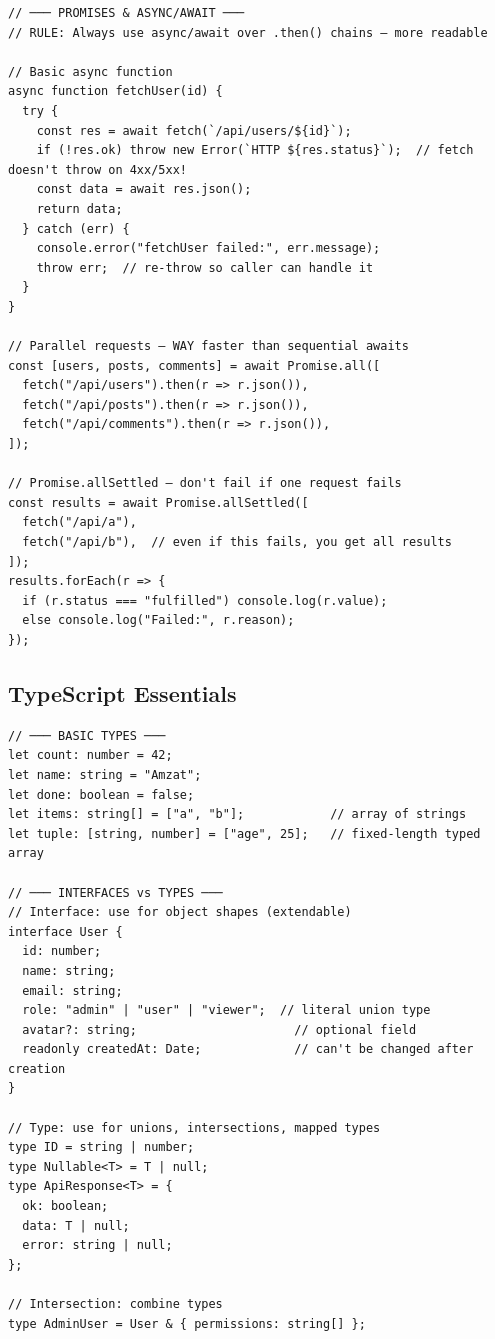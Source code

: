 \documentclass[10pt, a4paper]{article}
\begin{document}
\begin{lstlisting}[language=myjs]
// ─── PROMISES & ASYNC/AWAIT ───
// RULE: Always use async/await over .then() chains — more readable

// Basic async function
async function fetchUser(id) {
  try {
    const res = await fetch(`/api/users/${id}`);
    if (!res.ok) throw new Error(`HTTP ${res.status}`);  // fetch doesn't throw on 4xx/5xx!
    const data = await res.json();
    return data;
  } catch (err) {
    console.error("fetchUser failed:", err.message);
    throw err;  // re-throw so caller can handle it
  }
}

// Parallel requests — WAY faster than sequential awaits
const [users, posts, comments] = await Promise.all([
  fetch("/api/users").then(r => r.json()),
  fetch("/api/posts").then(r => r.json()),
  fetch("/api/comments").then(r => r.json()),
]);

// Promise.allSettled — don't fail if one request fails
const results = await Promise.allSettled([
  fetch("/api/a"),
  fetch("/api/b"),  // even if this fails, you get all results
]);
results.forEach(r => {
  if (r.status === "fulfilled") console.log(r.value);
  else console.log("Failed:", r.reason);
});
\end{lstlisting}


\subsection{TypeScript Essentials}


\begin{lstlisting}[language=myjs]
// ─── BASIC TYPES ───
let count: number = 42;
let name: string = "Amzat";
let done: boolean = false;
let items: string[] = ["a", "b"];            // array of strings
let tuple: [string, number] = ["age", 25];   // fixed-length typed array

// ─── INTERFACES vs TYPES ───
// Interface: use for object shapes (extendable)
interface User {
  id: number;
  name: string;
  email: string;
  role: "admin" | "user" | "viewer";  // literal union type
  avatar?: string;                      // optional field
  readonly createdAt: Date;             // can't be changed after creation
}

// Type: use for unions, intersections, mapped types
type ID = string | number;
type Nullable<T> = T | null;
type ApiResponse<T> = {
  ok: boolean;
  data: T | null;
  error: string | null;
};

// Intersection: combine types
type AdminUser = User & { permissions: string[] };
\end{lstlisting}
\end{document}

